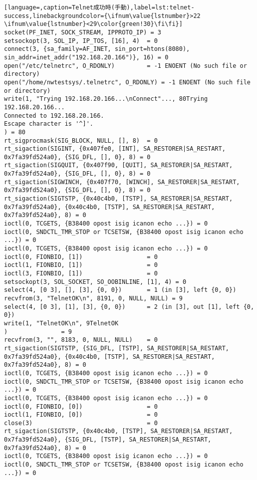 \begin{lstlisting}[language=,caption=Telnet成功時(手動),label=lst:telnet-success,linebackgroundcolor={\ifnum\value{lstnumber}>22 \ifnum\value{lstnumber}<29\color{green!30}\fi\fi}]
socket(PF_INET, SOCK_STREAM, IPPROTO_IP) = 3
setsockopt(3, SOL_IP, IP_TOS, [16], 4)  = 0
connect(3, {sa_family=AF_INET, sin_port=htons(8080), sin_addr=inet_addr("192.168.20.166")}, 16) = 0
open("/etc/telnetrc", O_RDONLY)         = -1 ENOENT (No such file or directory)
open("/home/nwtestsys/.telnetrc", O_RDONLY) = -1 ENOENT (No such file or directory)
write(1, "Trying 192.168.20.166...\nConnect"..., 80Trying 192.168.20.166...
Connected to 192.168.20.166.
Escape character is '^]'.
) = 80
rt_sigprocmask(SIG_BLOCK, NULL, [], 8)  = 0
rt_sigaction(SIGINT, {0x407fe0, [INT], SA_RESTORER|SA_RESTART, 0x7fa39fd524a0}, {SIG_DFL, [], 0}, 8) = 0
rt_sigaction(SIGQUIT, {0x407f90, [QUIT], SA_RESTORER|SA_RESTART, 0x7fa39fd524a0}, {SIG_DFL, [], 0}, 8) = 0
rt_sigaction(SIGWINCH, {0x407f70, [WINCH], SA_RESTORER|SA_RESTART, 0x7fa39fd524a0}, {SIG_DFL, [], 0}, 8) = 0
rt_sigaction(SIGTSTP, {0x40c4b0, [TSTP], SA_RESTORER|SA_RESTART, 0x7fa39fd524a0}, {0x40c4b0, [TSTP], SA_RESTORER|SA_RESTART, 0x7fa39fd524a0}, 8) = 0
ioctl(0, TCGETS, {B38400 opost isig icanon echo ...}) = 0
ioctl(0, SNDCTL_TMR_STOP or TCSETSW, {B38400 opost isig icanon echo ...}) = 0
ioctl(0, TCGETS, {B38400 opost isig icanon echo ...}) = 0
ioctl(0, FIONBIO, [1])                  = 0
ioctl(1, FIONBIO, [1])                  = 0
ioctl(3, FIONBIO, [1])                  = 0
setsockopt(3, SOL_SOCKET, SO_OOBINLINE, [1], 4) = 0
select(4, [0 3], [], [3], {0, 0})       = 1 (in [3], left {0, 0})
recvfrom(3, "TelnetOK\n", 8191, 0, NULL, NULL) = 9
select(4, [0 3], [1], [3], {0, 0})      = 2 (in [3], out [1], left {0, 0})
write(1, "TelnetOK\n", 9TelnetOK
)               = 9
recvfrom(3, "", 8183, 0, NULL, NULL)    = 0
rt_sigaction(SIGTSTP, {SIG_DFL, [TSTP], SA_RESTORER|SA_RESTART, 0x7fa39fd524a0}, {0x40c4b0, [TSTP], SA_RESTORER|SA_RESTART, 0x7fa39fd524a0}, 8) = 0
ioctl(0, TCGETS, {B38400 opost isig icanon echo ...}) = 0
ioctl(0, SNDCTL_TMR_STOP or TCSETSW, {B38400 opost isig icanon echo ...}) = 0
ioctl(0, TCGETS, {B38400 opost isig icanon echo ...}) = 0
ioctl(0, FIONBIO, [0])                  = 0
ioctl(1, FIONBIO, [0])                  = 0
close(3)                                = 0
rt_sigaction(SIGTSTP, {0x40c4b0, [TSTP], SA_RESTORER|SA_RESTART, 0x7fa39fd524a0}, {SIG_DFL, [TSTP], SA_RESTORER|SA_RESTART, 0x7fa39fd524a0}, 8) = 0
ioctl(0, TCGETS, {B38400 opost isig icanon echo ...}) = 0
ioctl(0, SNDCTL_TMR_STOP or TCSETSW, {B38400 opost isig icanon echo ...}) = 0

\end{lstlisting}
